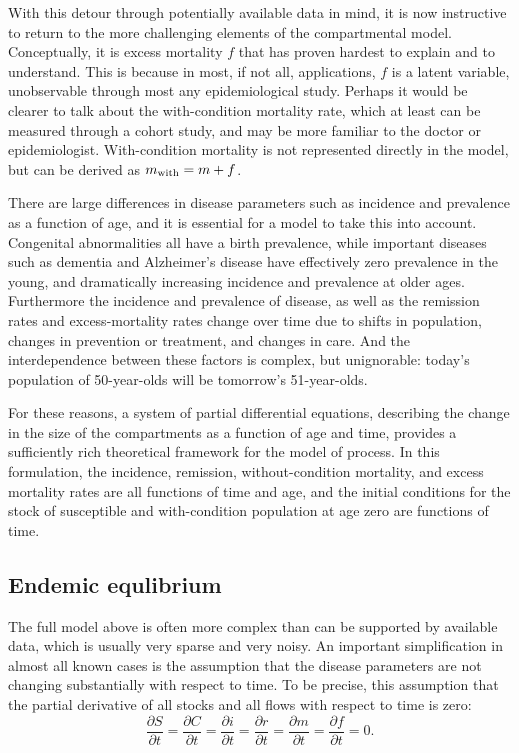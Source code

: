 With this detour through potentially available data in mind, it is now
instructive to return to the more challenging elements of the
compartmental model. Conceptually, it is excess mortality $f$ that has
proven hardest to explain and to understand. This is because in most,
if not all, applications, $f$ is a latent variable, unobservable
through most any epidemiological study. Perhaps it would be clearer to
talk about the with-condition mortality rate, which at least can be
measured through a cohort study, and may be more familiar to the
doctor or epidemiologist. With-condition mortality is not represented
directly in the model, but can be derived as $m_{\text{with}} = m+f$.

There are large differences in disease parameters such as incidence
and prevalence as a function of age, and it is essential for a model
to take this into account.  Congenital abnormalities all have a birth
prevalence, while important diseases such as dementia and Alzheimer's
disease have effectively zero prevalence in the young, and
dramatically increasing incidence and prevalence at older
ages. Furthermore the incidence and prevalence of disease, as well as
the remission rates and excess-mortality rates change over time due to
shifts in population, changes in prevention or treatment, and changes
in care. And the interdependence between these factors is complex, but
unignorable: today's population of 50-year-olds will be tomorrow's
51-year-olds.

For these reasons, a system of partial differential equations,
describing the change in the size of the compartments as a function of
age and time, provides a sufficiently rich theoretical framework for
the model of process.  In this formulation, the incidence, remission,
without-condition mortality, and excess mortality rates are all
functions of time and age, and the initial conditions for the stock of
susceptible and with-condition population at age zero are functions of
time.

\subsection{Endemic equlibrium}
\label{theory-forward_sim-compartmental_model-simplying_assumptions}

The full model above is often more complex than can be supported by
available data, which is usually very sparse and very noisy.  An
important simplification in almost all known cases is the assumption
that the disease parameters are not changing substantially with
respect to time. To be precise, this assumption that the partial
derivative of all stocks and all flows with respect to time is zero:
\[
\frac{\partial S}{\partial t}
=
\frac{\partial C}{\partial t}
=
\frac{\partial i}{\partial t}
=
\frac{\partial r}{\partial t}
=
\frac{\partial m}{\partial t}
=
\frac{\partial f}{\partial t}
=
0.
\]

